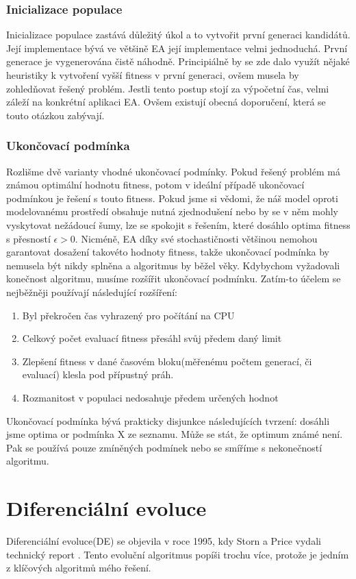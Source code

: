 \subsubsection{Inicializace populace}
Inicializace populace zastává důležitý úkol a to vytvořit první generaci kandidátů. Její implementace bývá ve většině EA její implementace velmi jednoduchá. První generace je vygenerována čistě náhodně. Principiálně by se zde dalo využít nějaké heuristiky k vytvoření vyšší fitness v první generaci, ovšem musela by zohledňovat řešený problém. Jestli tento postup stojí za výpočetní čas, velmi záleží na konkrétní aplikaci EA. Ovšem existují obecná doporučení, která se touto otázkou zabývají. 
\subsubsection{Ukončovací podmínka}
Rozlišme dvě varianty vhodné ukončovací podmínky. Pokud řešený problém má známou optimální hodnotu fitness, potom v ideální případě ukončovací podmínkou je řešení s touto fitness. Pokud jsme si vědomi, že náš model oproti modelovanému prostředí obsahuje nutná zjednodušení nebo by se v něm mohly vyskytovat nežádoucí šumy, lze se spokojit s řešením, které dosáhlo optima fitness s přesností $\epsilon > 0$. Nicméně, EA díky své stochastičnosti většinou nemohou garantovat dosažení takovéto hodnoty fitness, takže ukončovací podmínka by nemusela být nikdy splněna a algoritmus by běžel věky. Kdybychom vyžadovali konečnost algoritmu, musíme rozšířit ukončovací podmínku. Zatím-to účelem se nejběžněji používají následující rozšíření: \par
\begin{enumerate}
\item Byl překročen čas vyhrazený pro počítání na CPU
\item Celkový počet evaluací fitness přesáhl svůj předem daný limit 
\item Zlepšení fitness v dané časovém bloku(měřenému počtem generací, či evaluací) klesla pod přípustný práh.
\item Rozmanitost v populaci nedosahuje předem určených hodnot
\end{enumerate}
Ukončovací podmínka bývá prakticky disjunkce následujících tvrzení: dosáhli jsme optima or podmínka X ze seznamu. Může se stát, že optimum známé není. Pak se používá pouze zmíněných podmínek nebo se smíříme s nekonečností algoritmu. 

\section{Diferenciální evoluce}
Diferenciální evoluce(DE) se objevila v roce 1995, kdy Storn a Price vydali technický report \cite{Storn1997}. Tento evoluční algoritmus popíši trochu více, protože je jedním z klíčových algoritmů mého řešení. 
